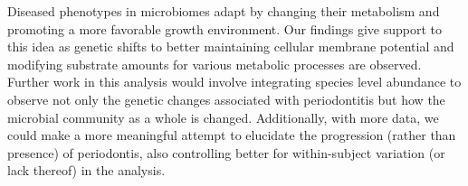 \documentclass{article}
\begin{document}
Diseased phenotypes in microbiomes adapt by changing their metabolism and promoting a more favorable growth environment. Our findings give support to this idea as genetic shifts to better maintaining cellular membrane potential and modifying substrate amounts for various metabolic processes are observed. Further work in this analysis would involve integrating species level abundance to observe not only the genetic changes associated with periodontitis but how the microbial community as a whole is changed. Additionally, with more data, we could make a more meaningful attempt to elucidate the progression (rather than presence) of periodontis, also controlling better for within-subject variation (or lack thereof) in the analysis.






\end{document}
